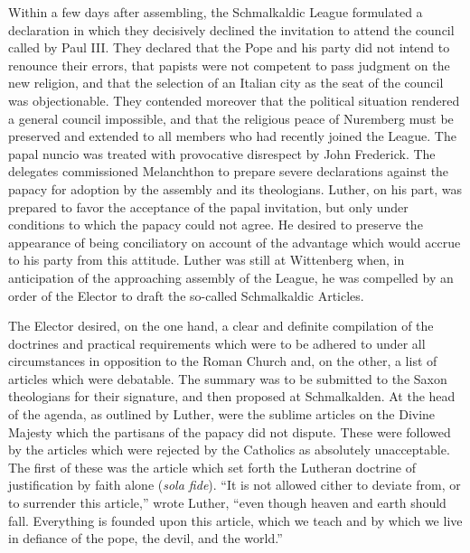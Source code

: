 Within a few days after assembling, the Schmalkaldic League formulated
a declaration in which they decisively declined the invitation
to attend the council called by Paul III. They declared that the Pope
and his party did not intend to renounce their errors, that papists
were not competent to pass judgment on the new religion, and that
the selection of an Italian city as the seat of the council was objectionable.
They contended moreover that the political situation rendered
a general council impossible, and that the religious peace of
Nuremberg must be preserved and extended to all members who had
recently joined the League. The papal nuncio was treated with provocative
disrespect by John Frederick. The delegates commissioned
Melanchthon to prepare severe declarations against the papacy for
adoption by the assembly and its theologians. Luther, on his part, was
prepared to favor the acceptance of the papal invitation, but only
under conditions to which the papacy could not agree. He desired to
preserve the appearance of being conciliatory on account of the advantage
which would accrue to his party from this attitude.
Luther was still at Wittenberg when, in anticipation of the approaching
assembly of the League, he was compelled by an order of
the Elector to draft the so-called Schmalkaldic Articles.

The Elector desired, on the one hand, a clear and definite compilation of
the doctrines and practical requirements which were to be adhered to under
all circumstances in opposition to the Roman Church and, on the other, a
list of articles which were debatable. The summary was to be submitted to
the Saxon theologians for their signature, and then proposed at Schmalkalden.
At the head of the agenda, as outlined by Luther, were the sublime
articles on the Divine Majesty which the partisans of the papacy did not
dispute. These were followed by the articles which were rejected by the
Catholics as absolutely unacceptable. The first of these was the article which
set forth the Lutheran doctrine of justification by faith alone (\textit{sola fide}).
“It is not allowed cither to deviate from, or to surrender this article,” wrote
Luther, “even though heaven and earth should fall. Everything is founded
upon this article, which we teach and by which we live in defiance of the
pope, the devil, and the world.”

